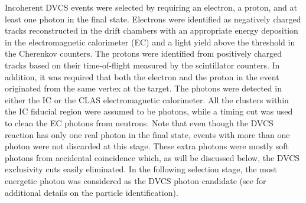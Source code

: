 \documentclass[twocolumn,nofootinbib,showpacs,prl,superscriptaddress,secnumarabic,amssymb,nobibnotes,aps,floatfix]{revtex4}
\begin{document}
Incoherent DVCS events were selected by requiring an electron, a proton, and at 
least one photon in the final state. Electrons were identified as negatively 
charged tracks reconstructed in the drift chambers with an appropriate energy 
deposition in the electromagnetic calorimeter (EC) and a light yield above the 
threshold in the Cherenkov counters. The protons were identified from 
positively charged tracks based on their time-of-flight measured 
by the scintillator counters.  In addition, it was required that both the 
electron and the proton in the event originated from the same vertex at the 
target. The photons were detected in either the IC or the CLAS electromagnetic 
calorimeter. All the clusters within the IC fiducial region were assumed to be 
photons, while a timing cut was used to clean the EC photons from neutrons.  
Note that even though the DVCS reaction has only one real photon in the final 
state, events with more than one photon were not discarded at this stage. These 
extra photons were mostly soft photons from accidental coincidence which, as 
will be discussed below, the DVCS exclusivity cuts easily eliminated. In the 
following selection stage, the most energetic photon was considered as the DVCS 
photon candidate (see \cite{Hattawy:thesis} for additional details on the 
particle identification).  
\end{document}
